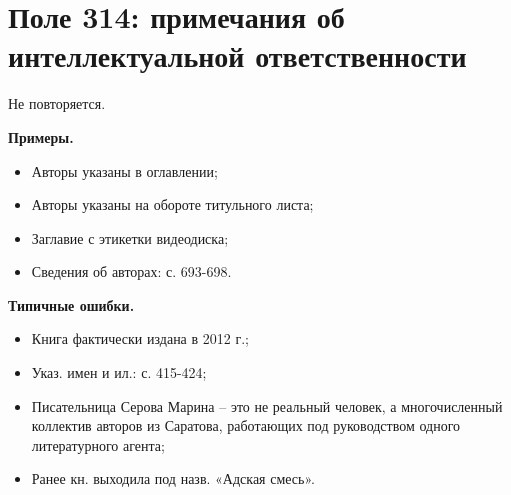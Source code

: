 \chapter*{Поле 314: примечания об интеллектуальной ответственности}

Не повторяется.

\textbf{Примеры.}

\begin{itemize}
	\item Авторы указаны в оглавлении;
	\item Авторы указаны на обороте титульного листа;
	\item Заглавие с этикетки видеодиска;
	\item Сведения об авторах: с. 693-698.
\end{itemize}

\textbf{Типичные ошибки.}

\begin{itemize}
	\item Книга фактически издана в 2012 г.;
	\item Указ. имен и ил.: с. 415-424;
	\item Писательница Серова Марина -- это не реальный человек, а многочисленный коллектив авторов из Саратова, работающих под руководством одного литературного агента;
	\item Ранее кн. выходила под назв. «Адская смесь».
\end{itemize}
